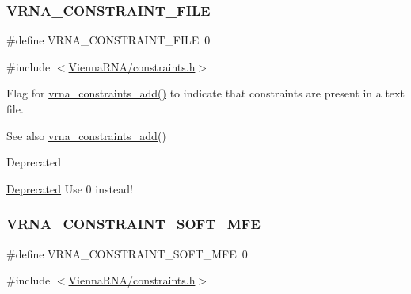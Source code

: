 \subsubsection{\texorpdfstring{V\+R\+N\+A\+\_\+\+C\+O\+N\+S\+T\+R\+A\+I\+N\+T\+\_\+\+F\+I\+LE}{VRNA\_CONSTRAINT\_FILE}}
{\footnotesize\ttfamily \#define V\+R\+N\+A\+\_\+\+C\+O\+N\+S\+T\+R\+A\+I\+N\+T\+\_\+\+F\+I\+LE~0}



{\ttfamily \#include $<$\hyperlink{constraints_8h}{Vienna\+R\+N\+A/constraints.\+h}$>$}



Flag for \hyperlink{group__constraints_ga35a401f680969a556858a8dd5f1d07cc}{vrna\+\_\+constraints\+\_\+add()} to indicate that constraints are present in a text file. 

\begin{DoxySeeAlso}{See also}
\hyperlink{group__constraints_ga35a401f680969a556858a8dd5f1d07cc}{vrna\+\_\+constraints\+\_\+add()} 
\end{DoxySeeAlso}
\begin{DoxyRefDesc}{Deprecated}
\item[\hyperlink{deprecated__deprecated000040}{Deprecated}]Use 0 instead!\end{DoxyRefDesc}
\mbox{\label{group__constraints_ga62aa195893d02d1a79ca94952748df36}} 
\subsubsection{\texorpdfstring{V\+R\+N\+A\+\_\+\+C\+O\+N\+S\+T\+R\+A\+I\+N\+T\+\_\+\+S\+O\+F\+T\+\_\+\+M\+FE}{VRNA\_CONSTRAINT\_SOFT\_MFE}}
{\footnotesize\ttfamily \#define V\+R\+N\+A\+\_\+\+C\+O\+N\+S\+T\+R\+A\+I\+N\+T\+\_\+\+S\+O\+F\+T\+\_\+\+M\+FE~0}



{\ttfamily \#include $<$\hyperlink{constraints_8h}{Vienna\+R\+N\+A/constraints.\+h}$>$}



